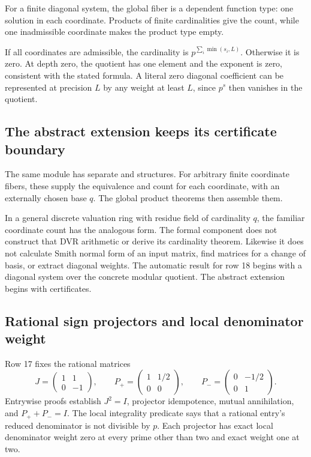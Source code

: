 For a finite diagonal system, the global fiber is a dependent function type: one solution in each coordinate. Products of finite cardinalities give the count, while one inadmissible coordinate makes the product type empty.

If all coordinates are admissible, the cardinality is $p^{\sum_i\min(s_i,L)}$. Otherwise it is zero. At depth zero, the quotient has one element and the exponent is zero, consistent with the stated formula. A literal zero diagonal coefficient can be represented at precision $L$ by any weight at least $L$, since $p^s$ then vanishes in the quotient.

\subsection{The abstract extension keeps its certificate boundary}

The same module has separate  and  structures. For arbitrary finite coordinate fibers, these supply the equivalence and count for each coordinate, with an externally chosen base $q$. The global product theorems then assemble them.

In a general discrete valuation ring with residue field of cardinality $q$, the familiar coordinate count has the analogous form. The formal component does not construct that DVR arithmetic or derive its cardinality theorem. Likewise it does not calculate Smith normal form of an input matrix, find matrices for a change of basis, or extract diagonal weights. The automatic result for row 18 begins with a diagonal system over the concrete modular quotient. The abstract extension begins with certificates.

\subsection{Rational sign projectors and local denominator weight}

Row 17 fixes the rational matrices
\[
J=\begin{pmatrix}1&1\\0&-1\end{pmatrix},\qquad
P_+=\begin{pmatrix}1&1/2\\0&0\end{pmatrix},\qquad
P_-=\begin{pmatrix}0&-1/2\\0&1\end{pmatrix}.
\]
Entrywise proofs establish $J^2=I$, projector idempotence, mutual annihilation, and $P_++P_-=I$. The local integrality predicate says that a rational entry's reduced denominator is not divisible by $p$. Each projector has exact local denominator weight zero at every prime other than two and exact weight one at two.

